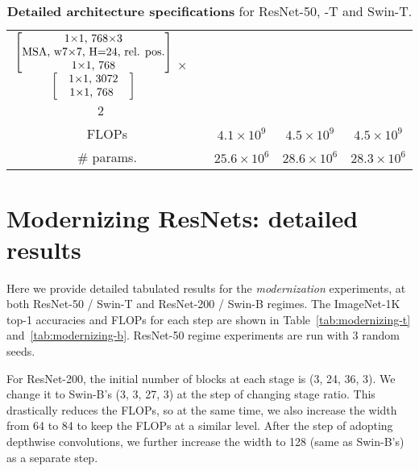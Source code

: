 \begin{table*}[!htbp]
{\begin{tabular}{c|c|c|c|c}
\multirow{5}{*}{$\begin{matrix}\begin{bmatrix}\text{1$\times$1, 768$\times$3}\\\text{MSA, w7$\times$7, H=24, rel. pos.}\\\text{1$\times$1, 768}\end{bmatrix}\\\begin{bmatrix}\text{\quad1$\times$1, 3072\quad}\\\text{\quad1$\times$1, 768\ \quad}\end{bmatrix}\end{matrix}$  $\times$ 2} \\
& & & & \\
& & & & \\
& & & & \\
& & & & \\
\hline
\multicolumn{2}{c|}{FLOPs}
&
$4.1 \times 10^9$
&
$4.5 \times 10^9$
&
$4.5 \times 10^9$
\\
\hline
\multicolumn{2}{c|}{\# params.}
&
$25.6 \times 10^6$
&
$28.6 \times 10^6$
&
$28.3 \times 10^6$ \\
\hline

\end{tabular}
}
\normalsize
\caption{\textbf{Detailed architecture specifications} for ResNet-50, \cnn{}-T and Swin-T.}
\label{table:arch-spec}
\end{table*}

\section{Modernizing ResNets: detailed results}
\label{sec:modernizing_result}
Here we provide detailed tabulated results for the \emph{modernization} experiments, at both ResNet-50 / Swin-T and ResNet-200 / Swin-B regimes. The ImageNet-1K top-1 accuracies and FLOPs for each step are shown in Table~\ref{tab:modernizing-t} and~\ref{tab:modernizing-b}. ResNet-50 regime experiments are run with 3 random seeds.

For ResNet-200, the initial number of blocks at each stage is (3, 24, 36, 3). We change it to Swin-B's (3, 3, 27, 3) at the step of changing stage ratio. This drastically reduces the FLOPs, so at the same time, we also increase the width from 64 to 84 to keep the FLOPs at a similar level. After the step of adopting depthwise convolutions, we further increase the width to 128 (same as Swin-B's) as a separate step. 

